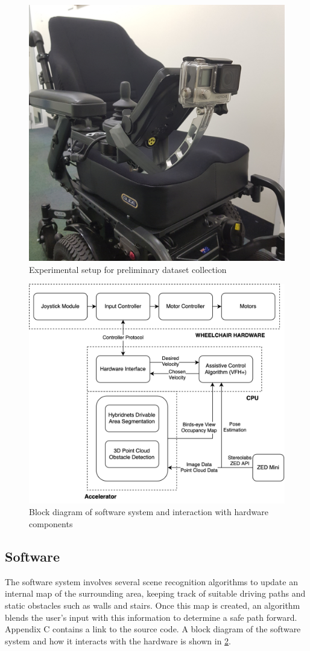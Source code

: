\begin{figure}[p]
    \centering
    \includegraphics[width=0.45\linewidth,angle=270,origin=c]{images/gopro_dataset_collection.jpg}
    \caption{Experimental setup for preliminary dataset collection}
    \label{fig:gopro_dataset_collection}
\end{figure}

\begin{figure}[p]
    \centering
    \includegraphics[width=0.8\linewidth]{images/block_diagram.png}
    \caption{Block diagram of software system and interaction with hardware components}
    \label{fig:block_diagram}
\end{figure}\clearpage

\subsection{Software}
The software system involves several scene recognition algorithms to update an internal
map of the surrounding area, keeping track of suitable driving paths and static obstacles
such as walls and stairs. Once this map is created, an algorithm blends the
user's input with this information to determine a safe path forward.
Appendix C contains a link to the source code. A block diagram of the software system
and how it interacts with the hardware is shown in \cref{fig:block_diagram}.

